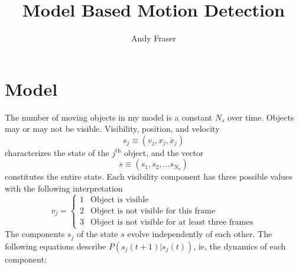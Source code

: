 \documentclass[12pt]{article}
\title{Model Based Motion Detection}
\author{Andy Fraser}
\newcommand{\xdot}{{\dot x}}
\renewcommand{\th}{^{\text{th}}}
\begin{document}
\maketitle

\section{Model}
\label{sec:model}

The number of moving objects in my model is a constant $N_s$ over
time.  Objects may or may not be visible.  Visibility, position, and
velocity
\begin{equation*}
  s_j \equiv (v_j,x_j,\xdot_j)  
\end{equation*}
characterizes the state of the $j\th$ object, and the vector
\begin{equation*}
  s \equiv \left(s_1, s_2, \ldots s_{N_o} \right)
\end{equation*}
constitutes the entire state.  Each visibility component has three
possible values with the following interpretation
\begin{equation*}
  v_j =
  \begin{cases}
    1 & \text{Object is visible} \\
    2 & \text{Object is not visible for this frame} \\
    3 & \text{Object is not visible for at least three frames}
  \end{cases}
\end{equation*}
The components $s_j$ of the state $s$ evolve independently of each
other.  The following equations describe $P(s_j(t+1)|s_j(t))$, ie, the
dynamics of each component:
\end{document}
